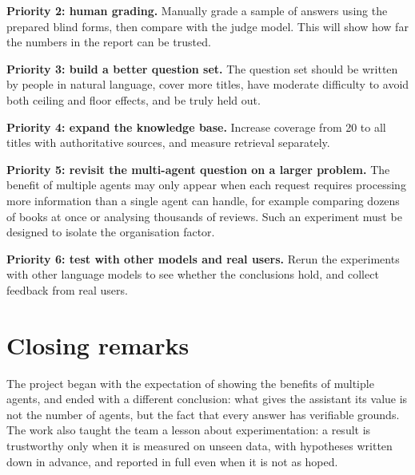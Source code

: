 \textbf{Priority 2: human grading.} Manually grade a sample of answers using the prepared blind forms, then compare with the judge model. This will show how far the numbers in the report can be trusted.

\textbf{Priority 3: build a better question set.} The question set should be written by people in natural language, cover more titles, have moderate difficulty to avoid both ceiling and floor effects, and be truly held out.

\textbf{Priority 4: expand the knowledge base.} Increase coverage from 20 to all titles with authoritative sources, and measure retrieval separately.

\textbf{Priority 5: revisit the multi-agent question on a larger problem.} The benefit of multiple agents may only appear when each request requires processing more information than a single agent can handle, for example comparing dozens of books at once or analysing thousands of reviews. Such an experiment must be designed to isolate the organisation factor.

\textbf{Priority 6: test with other models and real users.} Rerun the experiments with other language models to see whether the conclusions hold, and collect feedback from real users.

\section{Closing remarks}

The project began with the expectation of showing the benefits of multiple agents, and ended with a different conclusion: what gives the assistant its value is not the number of agents, but the fact that every answer has verifiable grounds. The work also taught the team a lesson about experimentation: a result is trustworthy only when it is measured on unseen data, with hypotheses written down in advance, and reported in full even when it is not as hoped.

